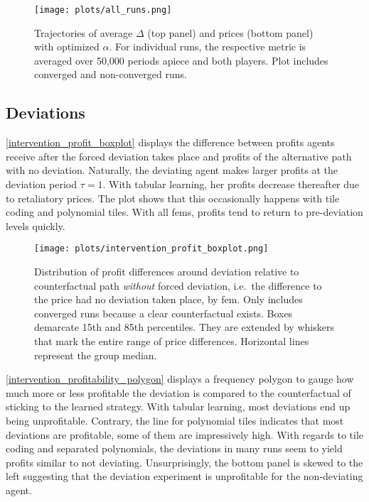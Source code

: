 \begin{figure}
	\texttt{[image: plots/all\_runs.png]}
	\caption[Trajectories of average $\Delta$ and prices with optimized $\alpha$]{Trajectories of average $\Delta$ (top panel) and prices (bottom panel) with optimized $\alpha$. For individual runs, the respective metric is averaged over 50,000 periods apiece and both players. Plot includes converged and non-converged runs.}
	\label{all_runs}
\end{figure}

\clearpage

\subsection{Deviations}\label{deviations_appendix}

\autoref{intervention_profit_boxplot} displays the difference between profits agents receive after the forced deviation takes place and profits of the alternative path with no deviation. Naturally, the deviating agent makes larger profits at the deviation period $\tau = 1$. With tabular learning, her profits decrease thereafter due to retaliatory prices. The plot shows that this occasionally happens with tile coding and polynomial tiles. With all \gls{fem}s, profits tend to return to pre-deviation levels quickly. 

\begin{figure}
	\texttt{[image: plots/intervention\_profit\_boxplot.png]}
	\caption[Distribution of profit differences around deviation by \gls{fem}]{Distribution of profit differences around deviation relative to counterfactual path \emph{without} forced deviation, i.e.\ the difference to the price had no deviation taken place, by \gls{fem}. Only includes converged runs because a clear counterfactual exists. Boxes demarcate 15th and 85th percentiles. They are extended by whiskers that mark the entire range of price differences. Horizontal lines represent the group median.}
	\label{intervention_profit_boxplot}
\end{figure}

\autoref{intervention_profitability_polygon} displays a frequency polygon to gauge how much more or less profitable the deviation is compared to the counterfactual of sticking to the learned strategy. With tabular learning, most deviations end up being unprofitable. Contrary, the line for polynomial tiles indicates that most deviations are profitable, some of them are impressively high. With regards to tile coding and separated polynomials, the deviations in many runs seem to yield profits similar to not deviating. Unsurprisingly, the bottom panel is skewed to the left suggesting that the deviation experiment is unprofitable for the non-deviating agent.


